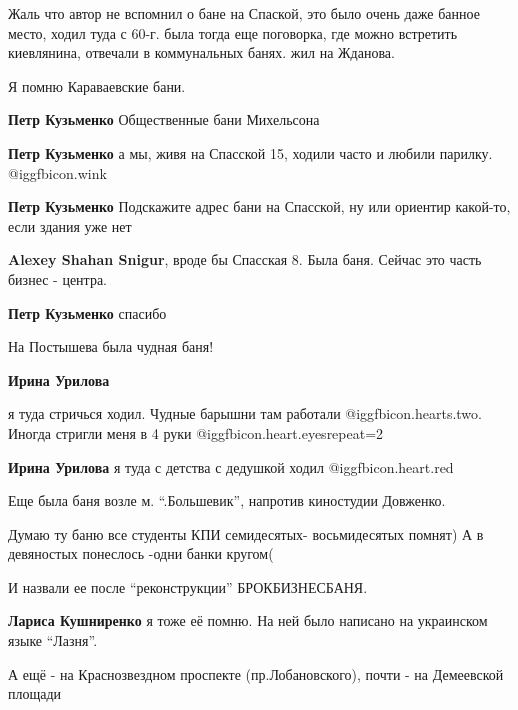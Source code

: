\begin{itemize}
\begin{itemize}
Жаль что автор не вспомнил о бане на Спаской, это было очень даже банное
место, ходил туда с 60-г. была тогда еще поговорка, где можно встретить
киевлянина, отвечали в коммунальных банях. жил на Жданова.


Я помню Караваевские бани.

\textbf{Петр Кузьменко} Общественные бани Михельсона

\textbf{Петр Кузьменко} а мы, живя на Спасской 15, ходили часто и любили парилку.  @igg{fbicon.wink} 

\textbf{Петр Кузьменко} Подскажите адрес бани на Спасской, ну или ориентир какой-то, если здания уже нет

\textbf{Alexey Shahan Snigur}, вроде бы Спасская 8. Была баня. Сейчас это часть бизнес - центра.

\textbf{Петр Кузьменко} спасибо

\end{itemize} %

На Постышева была чудная баня!

\begin{itemize} %
\textbf{Ирина Урилова} 

я туда стричься ходил. Чудные барышни там работали
@igg{fbicon.hearts.two}. Иногда стригли меня в 4 руки
@igg{fbicon.heart.eyes}{repeat=2} 

\textbf{Ирина Урилова} я туда с детства с дедушкой ходил @igg{fbicon.heart.red}
\end{itemize} %


Еще была баня возле м. \enquote{.Большевик}, напротив киностудии Довженко.

\begin{itemize} %
Думаю ту баню все студенты КПИ семидесятых- восьмидесятых помнят) А в девяностых понеслось -одни банки кругом(

И назвали ее после \enquote{реконструкции} БРОКБИЗНЕСБАНЯ.

\textbf{Лариса Кушниренко} я тоже её помню. На ней было написано на украинском языке \enquote{Лазня}.
\end{itemize} %

А ещё - на Краснозвездном проспекте (пр.Лобановского), почти - на Демеевской площади


\end{itemize}
